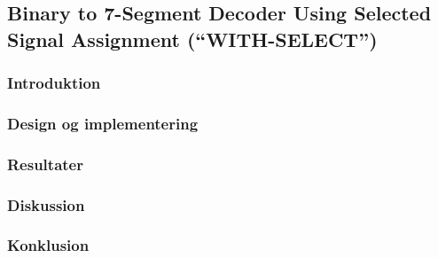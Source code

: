 \subsection{Binary to 7-Segment Decoder Using Selected Signal Assignment
(“WITH-SELECT”)}

\subsubsection{Introduktion}

\subsubsection{Design og implementering}

\subsubsection{Resultater}

\subsubsection{Diskussion}

\subsubsection{Konklusion}